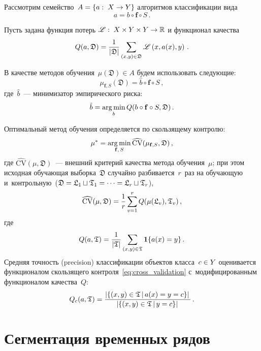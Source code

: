 \begin{multicols}{2}
Рассмотрим семейство~$A=\left\{a:\;X\hm\to Y\right\}$ алгоритмов классификации вида
\begin{equation}
\label{eq:classifiers}
a=b\circ \mathbf{f}\circ S\,.
\end{equation}

Пусть задана функция потерь
$
\mathscr{L}:\;X\times Y\times Y\hm\to \mathbb{R}
$
и функционал качества
\begin{equation}
\label{eq:empirical_risk}
Q(a,\mathfrak{D})=
\displaystyle\frac{\displaystyle 1\mathstrut}{\displaystyle |\mathfrak{D}|\mathstrut}
\sum\limits_{(x,y)\in\mathfrak{D}}\mathscr{L}\left(x, a(x),y\right)\,.
\end{equation}

В качестве методов обучения~$\mu(\mathfrak{D})\in A$ будем использовать следующие:
$$
\mu_{\mathbf{f},S}(\mathfrak{D})=\hat{b}\circ \mathbf{f}\circ S\,,
$$
где~$\hat{b}$~--- минимизатор эмпирического риска:
$$
\hat{b}=\mathop{\mathrm{arg}\,\mathrm{min}}_{b}Q(b\circ \mathbf{f}\circ S,\mathfrak{D})\,.
$$

Оптимальный метод обучения определяется по скользящему контролю:
$$
\mu^* = \mathop{\mathrm{arg}\,\mathrm{min}}_{\mathbf{f},\,S}\widehat{\mathrm{CV}}(\mu_{\mathbf{f},S},\mathfrak{D})\,,
$$
где $\widehat{\mathrm{CV}}(\mu,\mathfrak{D})$~--- внешний критерий качества метода 
обучения~$\mu$;
при этом исходная обучающая выборка~$\mathfrak{D}$ случайно разбивается~$r$~раз 
на обучающую и~контрольную~($\mathfrak{D}\hm=\mathfrak{L}_1\sqcup\mathfrak{T}_1=
\dots=\mathfrak{L}_r\sqcup\mathfrak{T}_r$),
\begin{equation}
\label{eq:cross_validation}
\widehat{\mathrm{CV}}(\mu,\mathfrak{D})=
\displaystyle\frac{\displaystyle 1\mathstrut}{\displaystyle r\mathstrut}\sum\limits_{v=1}^{r}Q(\mu(\mathfrak{L}_v),\mathfrak{T}_v)\,,
\end{equation}
где
\begin{equation}
\label{eq:total_quality}
Q(a,\mathfrak{T})=\displaystyle\frac{\displaystyle 1\mathstrut}{\displaystyle |\mathfrak{T}|\mathstrut}
\sum\limits_{(x,y)\in\mathfrak{T}}\boldsymbol{1}\{a(x)=y\}\,.
\end{equation}
Средняя точность (precision) классификации объектов класса~$c\hm\in Y$ оценивается функционалом скользящего контроля~\eqref{eq:cross_validation} с~модифицированным функционалом качества~$Q$:
\begin{equation}
\label{eq:class_quality}
Q_c(a,\mathfrak{T})=
\displaystyle\frac{\displaystyle \left|\left\{(x,y)\in\mathfrak{T}\,|\,a(x)=y=
c\right\}\right|\mathstrut}{\displaystyle \left|\left\{(x,y)\in\mathfrak{T}\,|\,y=c\right\}\right|\mathstrut}\,.
\end{equation}

\section{Сегментация временных рядов}


\end{multicols}
